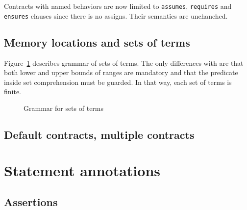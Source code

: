 
Contracts with named behaviors are now limited to \lstinline|assumes|,
\lstinline|requires| and \lstinline|ensures| clauses since there is no
assigns. Their semantics are unchanched.


\subsection{Memory locations and sets of terms}
\label{sec:locations}


Figure~\ref{fig:gram:locations} describes grammar of sets of terms. The only
differences with \acsl are that both lower and upper bounds of ranges are
mandatory and that the predicate inside set comprehension must be guarded. In
that way, each set of terms is finite.
\begin{figure}[htbp]
  \caption{Grammar for sets of terms}
\label{fig:gram:locations}
\end{figure}


\subsection{Default contracts, multiple contracts}
\nodiff


\section{Statement annotations}


\subsection{Assertions}
\label{sec:assertions}
\nodiff

